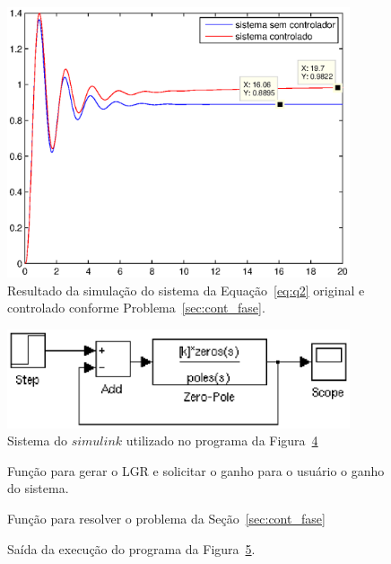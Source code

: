 \documentclass[a4paper]{article}
\begin{document}
\begin{figure}[ht]
   \centering
   \includegraphics[width=0.9\textwidth]{q2_sim}
   \caption{Resultado da simulação do sistema da Equação~\ref{eq:q2}
      original e controlado conforme Problema~\ref{sec:cont_fase}.}
   \label{fig:q2_sim}
\end{figure}

\begin{figure}[ht]
   \centering
   \includegraphics[width=0.9\textwidth]{q2_simulink}
   \caption{Sistema do $simulink$ utilizado no programa da Figura~\ref{verb:q2}}
   \label{fig:q2_simulink}
\end{figure}

\begin{figure}[ht]
   
   \caption{Função para gerar o LGR e solicitar o ganho para o usuário o ganho do sistema.}
   \label{verb:lgrGain}
\end{figure}

\begin{figure}[ht]
   
   \caption{Função para resolver o problema da Seção~\ref{sec:cont_fase}}
   \label{verb:q2}
\end{figure}

\begin{figure}[ht]
   
   \caption{Saída da execução do programa da Figura~\ref{verb:q2_out}.}
   \label{verb:q2_out}
\end{figure}


 
\end{document}
